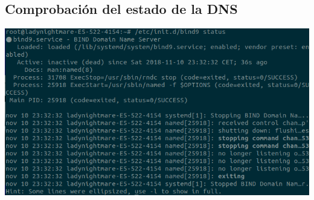 \documentclass{article}
\begin{document}
\subsection{Comprobación del estado de la DNS}

\begin{center}
	\includegraphics[scale=0.5]{status2.png} 
\end{center}
\end{document}

